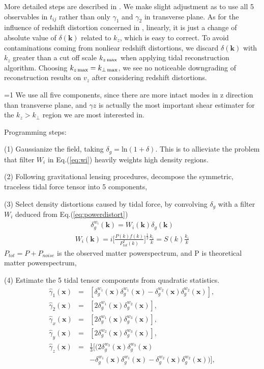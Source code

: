 More detailed steps are described in \cite{2015:zhu}.  
We make slight adjustment as to use all 5 observables in $t_{ij}$ 
rather than only $\gamma_1$ and $\gamma_2$ in transverse plane. 
As for the influence of redshift distortion concerned in \cite{2015:zhu}, 
linearly, it is just a change of absolute value of $\delta(\bm{k})$ related to $k_z$, which is easy to correct.
To avoid contaminations coming from nonliear redshift distortions, 
we discard $\delta(\bm{k})$ with $k_z$ greater than a cut off scale 
$k_{z\,\mathrm{max}}$ when applying tidal reconstruction algorithm. 
Choosing $k_{z\,\mathrm{max}}=k_{\perp\,\mathrm{max}}$, 
we see no noticeable downgrading of reconstruction results on $v_z$ 
after considering redshift distortions.  


=1
We use all five components, since there are more intact modes in 
z direction than transverse plane, 
and $\gamma z$ is actually the most important 
shear estimater for the $k_z>k_\perp$ region 
we are most interested in.

Programming steps:\noindent

(1) Gaussianize the field, taking 
$\delta_g=\mathrm{ln}(1+\delta)$. 
This is to allieviate the problem that filter $W_i$ in Eq.(\ref{eq:wi}) heavily weights high density regions.

(2) Following gravitational lensing procedures, decompose the symmetric, traceless tidal force tensor into 5 components, 

(3) Select density distortions caused by tidal force, 
by convolving $\delta_g$ with a filter $W_i$ 
deduced from Eq.(\ref{eq:powerdistort}) 
\begin{eqnarray}
\delta^{w_i}_g(\bm{k})=W_i(\bm{k})\delta_g(\bm{k}) 
\end{eqnarray}
\begin{eqnarray}
\label{eq:wi}
W_i(\bm{k})=i \bigg[\frac{P(k)f(k)}{P_{tot}^2(k)}\bigg]^{\frac{1}{2}}\frac{k_i}{k}
=S(k)\frac{k_i}{k}\nonumber
\end{eqnarray}
$P_{tot}=P+P_{noise}$ is the observed matter powerspectrum, 
and P is theoretical matter powerspectrum,

(4) Estimate the 5 tidal tensor components from quadratic statistics.
\begin{eqnarray}
\label{eq:gamma}
\hat{\gamma}_1(\bm{x})&=&
[{\delta}^{w_1}_g(\bm{x}){\delta}^{w_1}_g(\bm{x})-
{\delta}^{w_2}_g(\bm{x}){\delta}^{w_2}_g(\bm{x})],\nonumber\\
\hat{\gamma}_2(\bm{x})&=&
[2{\delta}^{w_1}_g(\bm{x}){\delta}^{w_2}_g(\bm{x})],\nonumber\\
\hat{\gamma}_x(\bm{x})&=&
[2{\delta}^{w_1}_g(\bm{x}){\delta}^{w_3}_g(\bm{x})],\\
\hat{\gamma}_y(\bm{x})&=&
[2{\delta}^{w_2}_g(\bm{x}){\delta}^{w_3}_g(\bm{x})],\nonumber\\
\hat{\gamma}_z(\bm{x})&=&
\frac{1}{3}[(2{\delta}^{w_3}_g(\bm{x}){\delta}^{w_3}_g(\bm{x})\nonumber\\
&&-{\delta}^{w_1}_g(\bm{x}){\delta}^{w_1}_g(\bm{x})
-{\delta}^{w_2}_g(\bm{x}){\delta}^{w_2}_g(\bm{x}))],\nonumber
\end{eqnarray}

